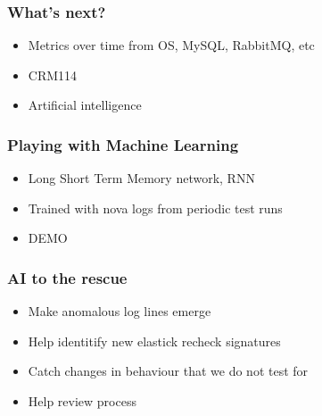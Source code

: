 \documentclass[aspectratio=169,11pt,hyperref={colorlinks=true}]{beamer}
\begin{document}

\begin{frame}
    \frametitle{What's next?}
    \begin{itemize}
        \item{Metrics over time from OS, MySQL, RabbitMQ, etc}
        \item{CRM114}
        \item{Artificial intelligence}
    \end{itemize}
\end{frame}

\begin{frame}
    \frametitle{Playing with Machine Learning}
    \begin{itemize}
        \item{Long Short Term Memory network, RNN}
        \item{Trained with nova logs from periodic test runs}
    \end{itemize}
    \begin{itemize}
        \item{DEMO}
    \end{itemize}
\end{frame}

\begin{frame}
    \frametitle{AI to the rescue}
    \begin{itemize}
        \item{Make anomalous log lines emerge}
    \end{itemize}
    \begin{itemize}
        \item{Help identitify new elastick recheck signatures}
        \item{Catch changes in behaviour that we do not test for}
        \item{Help review process}
    \end{itemize}
\end{frame}
\end{document}
